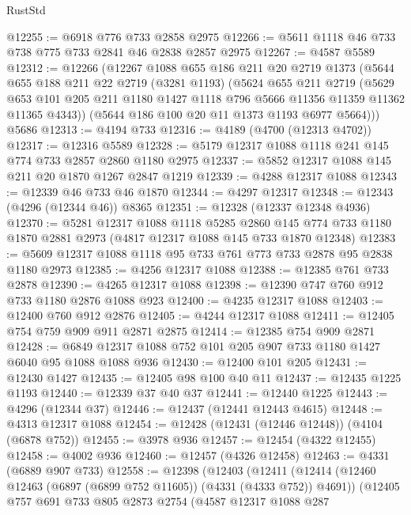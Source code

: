 \begin{lexlean}{RustStd}
\begin{coremodule}
@12255 := @6918 @776 @733 @2858 @2975
@12266 := @5611 @1118 @46 @733 @738 @775 @733 @2841 @46 @2838 @2857 @2975
@12267 := @4587 @5589
@12312 := @12266
    (@12267
      @1088
      @655
      @186
      @211
      @20
      @2719
      @1373
      (@5644
        @655
        @188
        @211
        @22
        @2719
        (@3281 @1193)
        (@5624
          @655
          @211
          @2719
          (@5629
            @653
            @101
            @205
            @211
            @1180
            @1427
            @1118
            @796
            @5666
            @11356
            @11359
            @11362
            @11365
            @4343))
        (@5644 @186 @100 @20 @11 @1373 @1193 @6977 @5664)))
    @5686
@12313 := @4194 @733
@12316 := @4189 (@4700 (@12313 @4702))
@12317 := @12316 @5589
@12328 := @5179 @12317 @1088 @1118 @241 @145 @774 @733 @2857 @2860 @1180 @2975
@12337 := @5852 @12317 @1088 @145 @211 @20 @1870 @1267 @2847 @1219
@12339 := @4288 @12317 @1088
@12343 := @12339 @46 @733 @46 @1870
@12344 := @4297 @12317
@12348 := @12343 (@4296 (@12344 @46)) @8365
@12351 := @12328 (@12337 @12348 @4936)
@12370 := @5281
    @12317
    @1088
    @1118
    @5285
    @2860
    @145
    @774
    @733
    @1180
    @1870
    @2881
    @2973
    (@4817 @12317 @1088 @145 @733 @1870 @12348)
@12383 := @5609 @12317 @1088 @1118 @95 @733 @761 @773 @733 @2878 @95 @2838 @1180 @2973
@12385 := @4256 @12317 @1088
@12388 := @12385 @761 @733 @2878
@12390 := @4265 @12317 @1088
@12398 := @12390 @747 @760 @912 @733 @1180 @2876 @1088 @923
@12400 := @4235 @12317 @1088
@12403 := @12400 @760 @912 @2876
@12405 := @4244 @12317 @1088
@12411 := @12405 @754 @759 @909 @911 @2871 @2875
@12414 := @12385 @754 @909 @2871
@12428 := @6849 @12317 @1088 @752 @101 @205 @907 @733 @1180 @1427 @6040 @95 @1088 @1088 @936
@12430 := @12400 @101 @205
@12431 := @12430 @1427
@12435 := @12405 @98 @100 @40 @11
@12437 := @12435 @1225 @1193
@12440 := @12339 @37 @40 @37
@12441 := @12440 @1225
@12443 := @4296 (@12344 @37)
@12446 := @12437 (@12441 @12443 @4615)
@12448 := @4313 @12317 @1088
@12454 := @12428 (@12431 (@12446 @12448)) (@4104 (@6878 @752))
@12455 := @3978 @936
@12457 := @12454 (@4322 @12455)
@12458 := @4002 @936
@12460 := @12457 (@4326 @12458)
@12463 := @4331 (@6889 @907 @733)
@12558 := @12398
    (@12403
      (@12411
        (@12414 (@12460 @12463 (@6897 (@6899 @752 @11605)) (@4331 (@4333 @752)) @4691))
        (@12405
          @757
          @691
          @733
          @805
          @2873
          @2754
          (@4587
            @12317
            @1088
            @287

\end{coremodule}
\end{lexlean}
